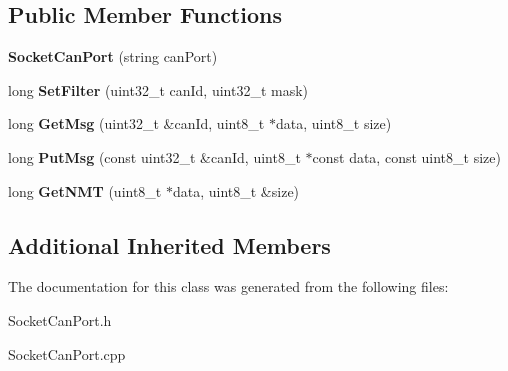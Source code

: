\subsection*{Public Member Functions}
\begin{DoxyCompactItemize}
\item 
\mbox{\label{classSocketCanPort_a087bc07f3c1658e3cb994d85fcb3da5e}} 
{\bfseries Socket\+Can\+Port} (string can\+Port)
\item 
\mbox{\label{classSocketCanPort_a1a5d0866524dae11ddff0d1ac22e0dd5}} 
long {\bfseries Set\+Filter} (uint32\+\_\+t can\+Id, uint32\+\_\+t mask)
\item 
\mbox{\label{classSocketCanPort_a4fe210160e70043ea78443630b9c4e86}} 
long {\bfseries Get\+Msg} (uint32\+\_\+t \&can\+Id, uint8\+\_\+t $\ast$data, uint8\+\_\+t size)
\item 
\mbox{\label{classSocketCanPort_a9375a0c1e33978c83ebd188100898633}} 
long {\bfseries Put\+Msg} (const uint32\+\_\+t \&can\+Id, uint8\+\_\+t $\ast$const data, const uint8\+\_\+t size)
\item 
\mbox{\label{classSocketCanPort_a2efe27bd3bb8c8127c89925e1e21535a}} 
long {\bfseries Get\+N\+MT} (uint8\+\_\+t $\ast$data, uint8\+\_\+t \&size)
\end{DoxyCompactItemize}
\subsection*{Additional Inherited Members}


The documentation for this class was generated from the following files\+:\begin{DoxyCompactItemize}
\item 
Socket\+Can\+Port.\+h\item 
Socket\+Can\+Port.\+cpp\end{DoxyCompactItemize}
